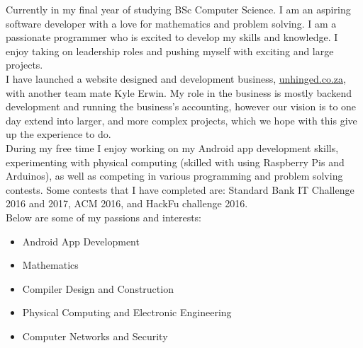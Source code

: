 %
%
\newpage
{}
    Currently in my final year of studying BSc Computer Science. I am an aspiring software developer with a love for mathematics and problem solving. I am a passionate programmer who is excited to develop my skills and knowledge. I enjoy taking on leadership roles and pushing myself with exciting and large projects. \\

    I have launched a website designed and development business, \href{www.unhinged.co.za}{\underline{unhinged.co.za}}, with another team mate Kyle Erwin. My role in the business is mostly backend development and running the business's accounting, however our vision is to one day extend into larger, and more complex projects, which we hope with this give up the experience to do.\\

    During my free time I enjoy working on my Android app development skills, experimenting with physical computing (skilled with using Raspberry Pis and Arduinos), as well as competing in various programming and problem solving contests. Some contests that I have completed are: Standard Bank IT Challenge 2016 and 2017, ACM 2016, and HackFu challenge 2016.\\

    \noindent
    Below are some of my passions and interests:
    \begin{itemize}
        \item Android App Development
        \item Mathematics
        \item Compiler Design and Construction
        \item Physical Computing and Electronic Engineering
        \item Computer Networks and Security
    \end{itemize}

